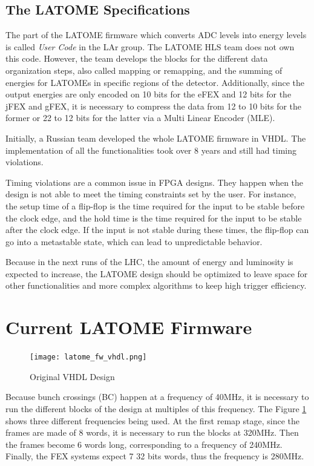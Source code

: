 \subsection{The LATOME Specifications}\label{sec:latome-specifications}
The part of the LATOME firmware which converts ADC levels into energy levels is called \textit{User Code} in the LAr group. The LATOME HLS team does not own this code. However, the team develops the blocks for the different data organization steps, also called mapping or remapping, and the summing of energies for LATOMEs in specific regions of the detector. Additionally, since the output energies are only encoded on 10 bits for the eFEX and 12 bits for the jFEX and gFEX, it is necessary to compress the data from 12 to 10 bits for the former or 22 to 12 bits for the latter via a Multi Linear Encoder (MLE).

Initially, a Russian team developed the whole LATOME firmware in VHDL. The implementation of all the functionalities took over 8 years and still had timing violations. 

Timing violations are a common issue in FPGA designs. They happen when the design is not able to meet the timing constraints set by the user. For instance, the setup time of a flip-flop is the time required for the input to be stable before the clock edge, and the hold time is the time required for the input to be stable after the clock edge. If the input is not stable during these times, the flip-flop can go into a metastable state, which can lead to unpredictable behavior.

Because in the next runs of the LHC, the amount of energy and luminosity is expected to increase, the LATOME design should be optimized to leave space for other functionalities and more complex algorithms to keep high trigger efficiency.

\section{Current LATOME Firmware}\label{sec:existing-design}


\begin{figure}
    \centering
    \texttt{[image: latome\_fw\_vhdl.png]}
    \caption{Original VHDL Design}
    \label{fig:original-vhdl-design}
\end{figure}

Because bunch crossings (BC) happen at a frequency of 40MHz, it is necessary to run the different blocks of the design at multiples of this frequency. The Figure \ref{fig:original-vhdl-design} shows three different frequencies being used. At the first remap stage, since the frames are made of 8 words, it is necessary to run the blocks at 320MHz. Then the frames become 6 words long, corresponding to a frequency of 240MHz. Finally, the FEX systems expect 7 32 bits words, thus the frequency is 280MHz.

